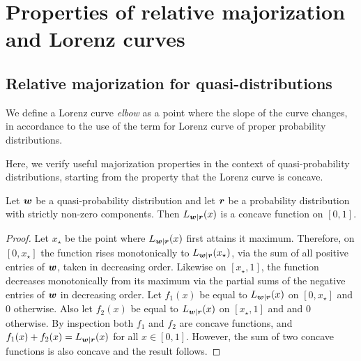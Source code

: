 \documentclass[pra,
aps,
twocolumn,
superscriptaddress,
groupedaddress,
nofootinbib,
reprint
]{revtex4-1}
\begin{document}
\section{Properties of relative majorization and Lorenz curves}
\label{app:major}

\subsection{Relative majorization for quasi-distributions}
\label{app:rel_quasi}

We define a Lorenz curve \emph{elbow} as a point where the slope of the curve changes, in accordance to the use of the term for Lorenz curve of proper probability distributions.

Here, we verify useful majorization properties in the context of quasi-probability distributions, starting from the property that the Lorenz curve is concave.
\begin{lemma}\label{L-concave} Let $\boldsymbol{w}$ be a quasi-probability distribution and let $\boldsymbol{r}$ be a probability distribution with strictly non-zero components. Then $L_{\boldsymbol{w}|\boldsymbol{r}}(x)$ is a concave function on $[0,1]$.
\end{lemma}
\begin{proof} 
Let $x_\star$ be the point where $L_{\boldsymbol{w}|\boldsymbol{r}}(x)$ first attains it maximum. Therefore, on $[0,x_\star]$ the function rises monotonically to $L_{\boldsymbol{w}|\boldsymbol{r}}(x_\star)$, via the sum of all positive entries of $\boldsymbol{w}$, taken in decreasing order. Likewise on $[x_\star, 1]$, the function decreases monotonically from its maximum via the partial sums of the negative entries of $\boldsymbol{w}$ in decreasing order. Let $f_1(x)$ be equal to $L_{\boldsymbol{w}|\boldsymbol{r}}(x)$ on $[0, x_\star]$ and $0$ otherwise. Also let $f_2(x)$ be equal to $L_{\boldsymbol{w}|\boldsymbol{r}}(x)$ on $[x_\star,1]$ and and $0$ otherwise. By inspection both $f_1$ and $f_2$ are concave functions, and $f_1(x) + f_2 (x) = L_{\boldsymbol{w}|\boldsymbol{r}}(x)$ for all $x\in [0,1]$. However, the sum of two concave functions is also concave and the result follows.
\end{proof}
\end{document}
